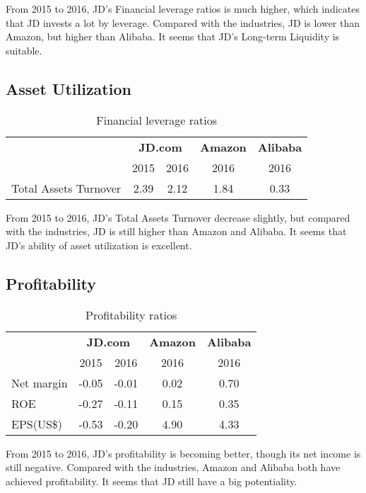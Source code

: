 From 2015 to 2016, JD’s Financial leverage ratios is much higher, which indicates that JD invests a lot by leverage. Compared with the industries, JD is lower than Amazon, but higher than Alibaba. It seems that JD’s Long-term Liquidity is suitable.

\subsection{Asset Utilization}

\begin{table}[H]	
	\begin{center}
		\begin{tabular}{p{5.6cm}cccc}
			\toprule 
			& \multicolumn{2}{c}{\textbf{JD.com}} & \multicolumn{1}{c}{\textbf{Amazon}}&\multicolumn{1}{c}{\textbf{Alibaba}}\\\cmidrule(lr){2-3} 
			\multirow{-2}{*}{} &\multicolumn{1}{c}{2015}&2016&\multicolumn{1}{c}{2016}&\multicolumn{1}{c}{2016}\\
			\midrule	
		Total Assets Turnover &	2.39&	2.12&	1.84&	0.33\\
			\bottomrule
		\end{tabular}
	\end{center}
	\caption{Financial leverage ratios}\label{table:1}
\end{table}

From 2015 to 2016, JD’s Total Assets Turnover decrease slightly, but compared with the industries, JD is still higher than Amazon and Alibaba. It seems that JD’s ability of asset utilization is excellent.

\subsection{Profitability}

\begin{table}[H]	
	\begin{center}
		\begin{tabular}{p{5.6cm}cccc}
			\toprule 
			& \multicolumn{2}{c}{\textbf{JD.com}} & \multicolumn{1}{c}{\textbf{Amazon}}&\multicolumn{1}{c}{\textbf{Alibaba}}\\\cmidrule(lr){2-3} 
			\multirow{-2}{*}{} &\multicolumn{1}{c}{2015}&2016&\multicolumn{1}{c}{2016}&\multicolumn{1}{c}{2016}\\
			\midrule	
		Net margin&	-0.05&	-0.01&	0.02&	0.70\\
		ROE&	-0.27&	-0.11&	0.15&	0.35\\
		EPS(US\$)&	-0.53&	-0.20&	4.90&	4.33\\
			\bottomrule
		\end{tabular}
	\end{center}
	\caption{Profitability ratios}\label{table:1}
\end{table}
From 2015 to 2016, JD’s profitability is becoming better, though its net income is still negative. Compared with the industries, Amazon and Alibaba both have achieved profitability. It seems that JD still have a big potentiality.
